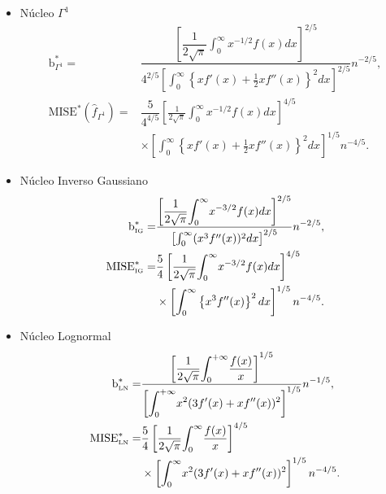 \begin{itemize}
	\item Núcleo $\Gamma^1$
	\begin{align}
	\label{MISEoptGamma}
	\text{b}^*_{\Gamma^1}=&\dfrac{\left[\dfrac{1}{2\sqrt{\pi}} \displaystyle{\int_{0}^{\infty}} x^{-1/2}f(x)dx \right]^{2/5}}
	{4^{2/5} \left[\displaystyle{\int_{0}^{\infty}} \left\{x f'(x) +\frac{1}{2} x f''(x)\right\}^2 dx \right]^{2/5}} n^{-2/5},\\
	\nonumber \text{MISE}^*(\widehat{f}_{\Gamma^1})=&\dfrac{5}{4^{4/5}} \left[\frac{1}{2\sqrt{\pi}} \int_{0}^{\infty} x^{-1/2}f(x)dx \right]^{4/5} \\
	&\times \left[\int_{0}^{\infty}  \left\{x f'(x) +\frac{1}{2} x f''(x)\right\}^2 dx \right]^{1/5} n^{-4/5}. 
	\end{align}
	\item Núcleo Inverso Gaussiano
	\begin{align}
	\label{MISEoptIG}
	\text{b}^*_{\text{\tiny{IG}}}=&\dfrac{\left[\dfrac{1}{2\sqrt{\pi}} \displaystyle{\int_{0}^{\infty}} x^{-3/2}f(x)dx \right]^{2/5}}
	{ \left[\int_{0}^{\infty}(x^3 f''(x))^2 dx \right]^{2/5}} n^{-2/5},\\
	\nonumber \text{MISE}^*_{\text{\tiny{IG}}}=&\dfrac{5}{4} \left[\frac{1}{2\sqrt{\pi}} \displaystyle{\int_{0}^{\infty}} x^{-3/2}f(x)dx \right]^{4/5} \\
	&\times \left[\displaystyle{\int_{0}^{\infty}}  \left\{x^3 f''(x) \right\}^2 dx \right]^{1/5} n^{-4/5} .
	\end{align}
	\item Núcleo Lognormal
	\begin{align}
	\label{MISEoptLN}
	\text{b}^*_{\text{\tiny{LN}}}=&\dfrac{\left[\dfrac{1}{2\sqrt{\pi}}\displaystyle{\int_0^{+\infty}}\frac{f(x)}{x}\right]^{1/5}}{\left[\displaystyle{\int_0^{+\infty}} x^2(3f'(x)+xf''(x))^2\right]^{1/5}}n^{-1/5},\\
	\nonumber \text{MISE}^*_{\text{\tiny{LN}}}=&\dfrac{5}{4}  \left[\dfrac{1}{2\sqrt{\pi}}\displaystyle{\int_{0}^{\infty}} \frac{f(x)}{x} \right]^{4/5} \\
	&\times \left[\displaystyle{\int_{0}^{\infty}}  x^2 (3 f'(x) + x f''(x))^2 \right]^{1/5} n^{-4/5}.
	\end{align}
\end{itemize}

